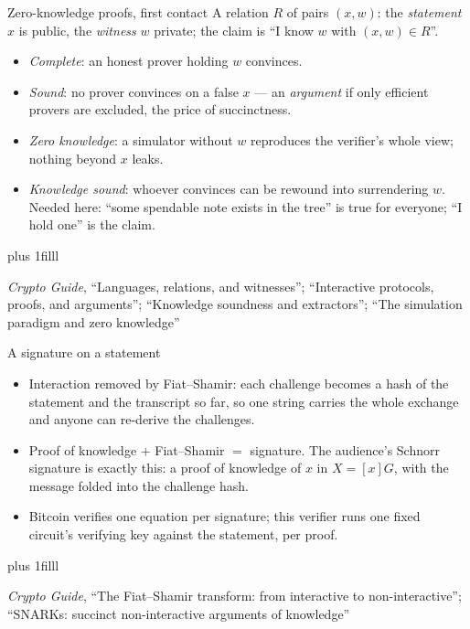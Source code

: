 \documentclass[aspectratio=169,11pt]{beamer}
\newcommand{\src}[1]{\par\vskip0pt plus 1filll
  {\fontsize{6}{7.2}\selectfont\color{arbdim}\raggedright #1\par}}
\begin{document}
\begin{frame}{Zero-knowledge proofs, first contact}
A relation $R$ of pairs $(x, w)$: the \emph{statement} $x$ is public, the
\emph{witness} $w$ private; the claim is ``I know $w$ with
$(x, w) \in R$''.
\begin{itemize}
  \item \emph{Complete}: an honest prover holding $w$ convinces.
  \item \emph{Sound}: no prover convinces on a false $x$ --- an
    \emph{argument} if only efficient provers are excluded, the price of
    succinctness.
  \item \emph{Zero knowledge}: a simulator without $w$ reproduces the
    verifier's whole view; nothing beyond $x$ leaks.
  \item \emph{Knowledge sound}: whoever convinces can be rewound into
    surrendering $w$. Needed here: ``some spendable note exists in the
    tree'' is true for everyone; ``I hold one'' is the claim.
\end{itemize}
\src{\emph{Crypto Guide}, ``Languages, relations, and witnesses'';
  ``Interactive protocols, proofs, and arguments''; ``Knowledge soundness
  and extractors''; ``The simulation paradigm and zero knowledge''}
\end{frame}

\begin{frame}{A signature on a statement}
\begin{itemize}
  \item Interaction removed by Fiat--Shamir: each challenge becomes a hash
    of the statement and the transcript so far, so one string carries the
    whole exchange and anyone can re-derive the challenges.
  \item Proof of knowledge $+$ Fiat--Shamir $=$ signature. The audience's
    Schnorr signature is exactly this: a proof of knowledge of $x$ in
    $X = [x]G$, with the message folded into the challenge hash.
  \item Bitcoin verifies one equation per signature; this verifier runs
    one fixed circuit's verifying key against the statement, per proof.
\end{itemize}
\src{\emph{Crypto Guide}, ``The Fiat--Shamir transform: from interactive to
  non-interactive''; ``SNARKs: succinct non-interactive arguments of
  knowledge''}
\end{frame}
\end{document}
